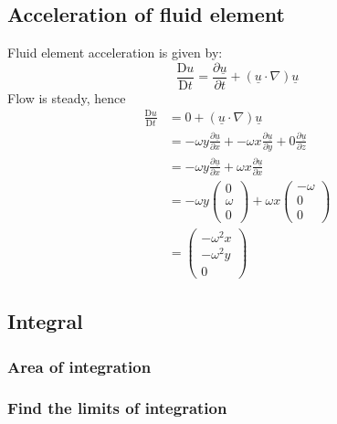 \documentclass[11pt]{article}
\numberwithin{equation}{section}
\begin{document}
\subsection{Acceleration of fluid element}
Fluid element acceleration is given by:
\begin{equation}
    \frac{\textrm{D}u}{\textrm{D}t} = \frac{\partial \underline{u}}{\partial t} + \left(\underline{u}\cdot \nabla\right)\underline{u}
\end{equation}
Flow is steady, hence
\begin{align}
    \frac{\textrm{D}u}{\textrm{D}t} &= 0 + \left(\underline{u}\cdot \nabla\right)\underline{u}\\
    &= -\omega y\frac{\partial \underline{u}}{\partial x} + -\omega x \frac{\partial \underline{u}}{\partial y} + 0 \frac{\partial \underline{u}}{\partial z}\\
    &= -\omega y\frac{\partial \underline{u}}{\partial x} + \omega x \frac{\partial \underline{u}}{\partial x} \\
    &= -\omega y \begin{pmatrix}
        0\\
        \omega\\
        0
    \end{pmatrix} + \omega x \begin{pmatrix}
        -\omega\\
        0\\
        0
    \end{pmatrix}\\
    &= \begin{pmatrix}
        -\omega^2 x\\
        -\omega^2 y\\
        0
    \end{pmatrix}
\end{align}
\subsection{Integral}
\subsubsection{Area of integration}
\subsubsection{Find the limits of integration}
\end{document}
